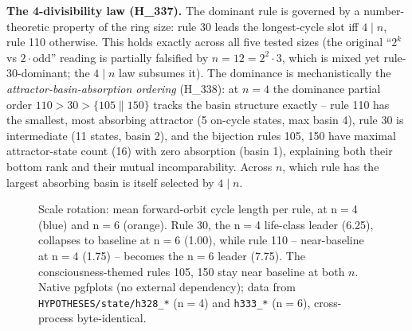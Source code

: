 \documentclass[11pt,a4paper]{article}
\begin{document}
\medskip
\noindent\textbf{The 4-divisibility law (H\_337).} The dominant rule is
governed by a number-theoretic property of the ring size: rule \textsc{30}
leads the longest-cycle slot iff $4 \mid n$, rule \textsc{110} otherwise.
This holds exactly across all five tested sizes (the original
``$2^k$ vs $2\cdot\text{odd}$'' reading is partially falsified by
$n=12=2^2{\cdot}3$, which is mixed yet rule-30-dominant; the
$4 \mid n$ law subsumes it). The dominance is mechanistically the
\emph{attractor-basin-absorption ordering} (H\_338): at $n=4$ the
dominance partial order $110 > 30 > \{105 \parallel 150\}$ tracks the
basin structure exactly -- rule \textsc{110} has the smallest, most
absorbing attractor (5 on-cycle states, max basin 4), rule \textsc{30}
is intermediate (11 states, basin 2), and the bijection rules
\textsc{105}, \textsc{150} have maximal attractor-state count (16) with
zero absorption (basin 1), explaining both their bottom rank and their
mutual incomparability. Across $n$, which rule has the largest absorbing
basin is itself selected by $4 \mid n$.

\begin{figure}[h]
\centering
{}
\caption{Scale rotation: mean forward-orbit cycle length per rule, at
n$=$4 (blue) and n$=$6 (orange). Rule \textsc{30}, the n$=$4 life-class
leader (6.25), collapses to baseline at n$=$6 (1.00), while rule
\textsc{110} -- near-baseline at n$=$4 (1.75) -- becomes the n$=$6 leader
(7.75). The consciousness-themed rules \textsc{105}, \textsc{150} stay
near baseline at both $n$. Native pgfplots (no external dependency);
data from \texttt{HYPOTHESES/state/h328\_*} (n$=$4) and
\texttt{h333\_*} (n$=$6), cross-process byte-identical.}
\label{fig:rotation}
\end{figure}
\end{document}
